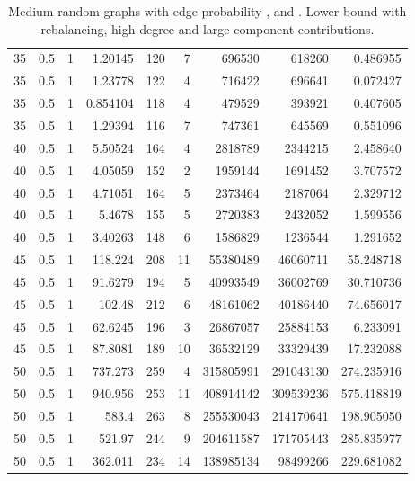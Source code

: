 \documentclass[a4paper,11pt]{article}
\begin{document}
\begin{table}
\begin{center}
\begin{tabular}{|rrr|r|r|rrr|r|}
35 & 0.5 & 1 & 1.20145 & 120 & 7 & 696530 & 618260 & 0.486955 \\
35 & 0.5 & 1 & 1.23778 & 122 & 4 & 716422 & 696641 & 0.072427 \\
35 & 0.5 & 1 & 0.854104 & 118 & 4 & 479529 & 393921 & 0.407605 \\
35 & 0.5 & 1 & 1.29394 & 116 & 7 & 747361 & 645569 & 0.551096 \\
40 & 0.5 & 1 & 5.50524 & 164 & 4 & 2818789 & 2344215 & 2.458640 \\
40 & 0.5 & 1 & 4.05059 & 152 & 2 & 1959144 & 1691452 & 3.707572 \\
40 & 0.5 & 1 & 4.71051 & 164 & 5 & 2373464 & 2187064 & 2.329712 \\
40 & 0.5 & 1 & 5.4678 & 155 & 5 & 2720383 & 2432052 & 1.599556 \\
40 & 0.5 & 1 & 3.40263 & 148 & 6 & 1586829 & 1236544 & 1.291652 \\
45 & 0.5 & 1 & 118.224 & 208 & 11 & 55380489 & 46060711 & 55.248718 \\
45 & 0.5 & 1 & 91.6279 & 194 & 5 & 40993549 & 36002769 & 30.710736 \\
45 & 0.5 & 1 & 102.48 & 212 & 6 & 48161062 & 40186440 & 74.656017 \\
45 & 0.5 & 1 & 62.6245 & 196 & 3 & 26867057 & 25884153 & 6.233091 \\
45 & 0.5 & 1 & 87.8081 & 189 & 10 & 36532129 & 33329439 & 17.232088 \\
50 & 0.5 & 1 & 737.273 & 259 & 4 & 315805991 & 291043130 & 274.235916 \\
50 & 0.5 & 1 & 940.956 & 253 & 11 & 408914142 & 309539236 & 575.418819 \\
50 & 0.5 & 1 & 583.4 & 263 & 8 & 255530043 & 214170641 & 198.905050 \\
50 & 0.5 & 1 & 521.97 & 244 & 9 & 204611587 & 171705443 & 285.835977 \\
50 & 0.5 & 1 & 362.011 & 234 & 14 & 138985134 & 98499266 & 229.681082 \\
\hline
\end{tabular}
\end{center}
\caption{Medium random graphs with edge probability ,
   and . Lower bound with rebalancing,
  high-degree and large component contributions.}
\label{tab:medium-all}
\end{table}
\end{document}
